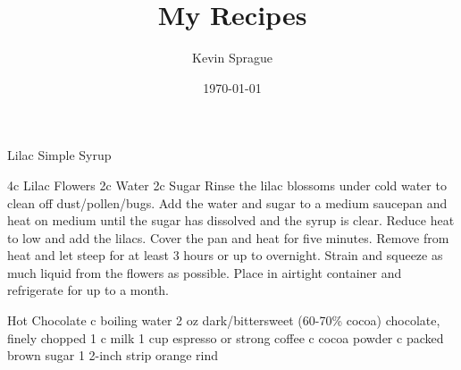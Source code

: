 \documentclass[12pt]{cookbook}
\title{My Recipes}
\author{Kevin Sprague}
\date{\today}
\begin{document}
\begin{recipe}{Lilac Simple Syrup}

\ingredients
	{4c Lilac Flowers}
	{2c Water}
	{2c Sugar}
\stopingredients
\preparation
	{Rinse the lilac blossoms under cold water to clean off dust/pollen/bugs.}
	{Add the water and sugar to a medium saucepan and heat on medium until the sugar has dissolved and the syrup is clear.}
	{Reduce heat to low and add the lilacs. Cover the pan and heat for five minutes.}
	{Remove from heat and let steep for at least 3 hours or up to overnight.}
	{Strain and squeeze as much liquid from the flowers as possible.}
	{Place in airtight container and refrigerate for up to a month.}
\stopprep
\end{recipe}
\begin{recipe}{Hot Chocolate}
\ingredients
    { c boiling water}
    {2 oz dark/bittersweet (60-70\% cocoa) chocolate, finely chopped}
    {1  c milk}
    {1 cup espresso or strong coffee}
    { c cocoa powder}
    { c packed brown sugar}
    {1 2-inch strip orange rind}
\stopingredients
\preparation
    {}{}{}{}{}
\end{recipe}
\end{document}
